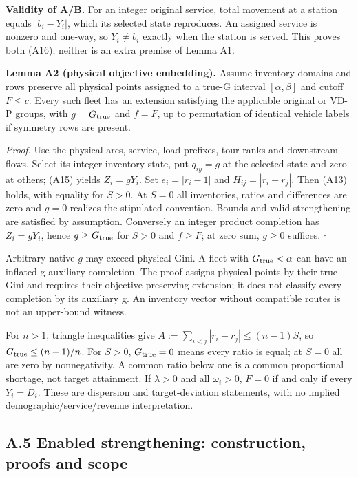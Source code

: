 \documentclass[
  american,
  11pt,
]{article}
\begin{document}
\textbf{Validity of A/B.} For an integer original service, total
movement at a station equals \(|b_i-Y_i|\), which its selected state
reproduces. An assigned service is nonzero and one-way, so
\(Y_i\ne b_i\) exactly when the station is served. This proves both
(A16); neither is an extra premise of Lemma A1.


\textbf{Lemma A2 (physical objective embedding).} Assume inventory
domains and rows preserve all physical points assigned to a true-G
interval \([\alpha,\beta]\) and cutoff \(F\le c\). Every such fleet has
an extension satisfying the applicable original or VD-P groups, with
\(g=G_{\rm true}\) and \(f=F\), up to permutation of identical vehicle
labels if symmetry rows are present.

\emph{Proof.} Use the physical arcs, service, load prefixes, tour ranks
and downstream flows. Select its integer inventory state, put
\(q_{iy}=g\) at the selected state and zero at others; (A15) yields
\(Z_i=gY_i\). Set \(e_i=|r_i-1|\) and \(H_{ij}=|r_i-r_j|\). Then (A13)
holds, with equality for \(S>0\). At \(S=0\) all inventories, ratios and
differences are zero and \(g=0\) realizes the stipulated convention.
Bounds and valid strengthening are satisfied by assumption. Conversely
an integer product completion has \(Z_i=gY_i\), hence
\(g\ge G_{\rm true}\) for \(S>0\) and \(f\ge F\); at zero sum, \(g\ge0\)
suffices. \(\square\)

Arbitrary native \(g\) may exceed physical Gini. A fleet with
\(G_{\rm true}<\alpha\) can have an inflated-g auxiliary completion. The
proof assigns physical points by their true Gini and requires their
objective-preserving extension; it does not classify every completion by
its auxiliary g. An inventory vector without compatible routes is not an
upper-bound witness.

For \(n>1\), triangle inequalities give
\(A:=\sum_{i<j}|r_i-r_j|\le(n-1)S\), so \(G_{\rm true}\le(n-1)/n\). For
\(S>0\), \(G_{\rm true}=0\) means every ratio is equal; at \(S=0\) all
are zero by nonnegativity. A common ratio below one is a common
proportional shortage, not target attainment. If \(\lambda>0\) and all
\(\omega_i>0\), \(F=0\) if and only if every \(Y_i=D_i\). These are
dispersion and target-deviation statements, with no implied
demographic/service/revenue interpretation.

\subsection{A.5 Enabled strengthening: construction, proofs and
scope}\label{a.5-enabled-strengthening-construction-proofs-and-scope}
\end{document}
